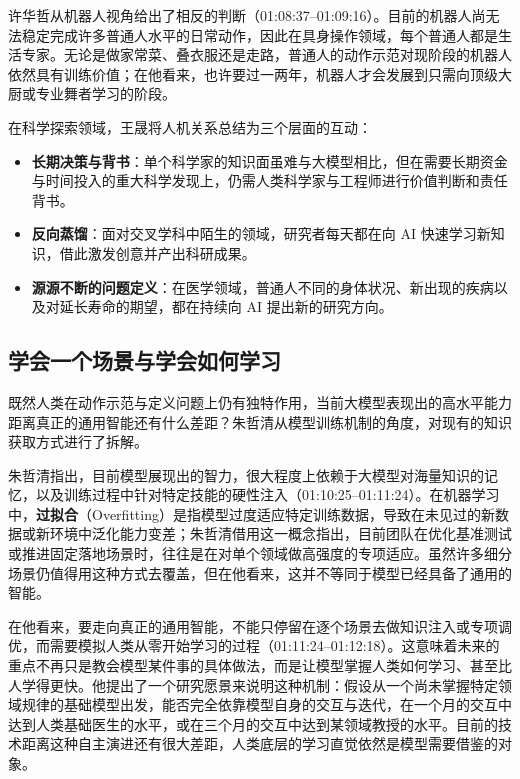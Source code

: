 \documentclass[UTF8,a4paper,11pt,fontset=fandol]{ctexart}
\begin{document}
许华哲从机器人视角给出了相反的判断（01:08:37–01:09:16）。目前的机器人尚无法稳定完成许多普通人水平的日常动作，因此在具身操作领域，每个普通人都是生活专家。无论是做家常菜、叠衣服还是走路，普通人的动作示范对现阶段的机器人依然具有训练价值；在他看来，也许要过一两年，机器人才会发展到只需向顶级大厨或专业舞者学习的阶段。

在科学探索领域，王晟将人机关系总结为三个层面的互动：

\begin{itemize}
\item \textbf{长期决策与背书}：单个科学家的知识面虽难与大模型相比，但在需要长期资金与时间投入的重大科学发现上，仍需人类科学家与工程师进行价值判断和责任背书。
\item \textbf{反向蒸馏}：面对交叉学科中陌生的领域，研究者每天都在向 AI 快速学习新知识，借此激发创意并产出科研成果。
\item \textbf{源源不断的问题定义}：在医学领域，普通人不同的身体状况、新出现的疾病以及对延长寿命的期望，都在持续向 AI 提出新的研究方向。
\end{itemize}

\subsection{学会一个场景与学会如何学习}
既然人类在动作示范与定义问题上仍有独特作用，当前大模型表现出的高水平能力距离真正的通用智能还有什么差距？朱哲清从模型训练机制的角度，对现有的知识获取方式进行了拆解。

朱哲清指出，目前模型展现出的智力，很大程度上依赖于大模型对海量知识的记忆，以及训练过程中针对特定技能的硬性注入（01:10:25–01:11:24）。在机器学习中，\textbf{过拟合}（Overfitting）是指模型过度适应特定训练数据，导致在未见过的新数据或新环境中泛化能力变差；朱哲清借用这一概念指出，目前团队在优化基准测试或推进固定落地场景时，往往是在对单个领域做高强度的专项适应。虽然许多细分场景仍值得用这种方式去覆盖，但在他看来，这并不等同于模型已经具备了通用的智能。

在他看来，要走向真正的通用智能，不能只停留在逐个场景去做知识注入或专项调优，而需要模拟人类从零开始学习的过程（01:11:24–01:12:18）。这意味着未来的重点不再只是教会模型某件事的具体做法，而是让模型掌握人类如何学习、甚至比人学得更快。他提出了一个研究愿景来说明这种机制：假设从一个尚未掌握特定领域规律的基础模型出发，能否完全依靠模型自身的交互与迭代，在一个月的交互中达到人类基础医生的水平，或在三个月的交互中达到某领域教授的水平。目前的技术距离这种自主演进还有很大差距，人类底层的学习直觉依然是模型需要借鉴的对象。
\end{document}

